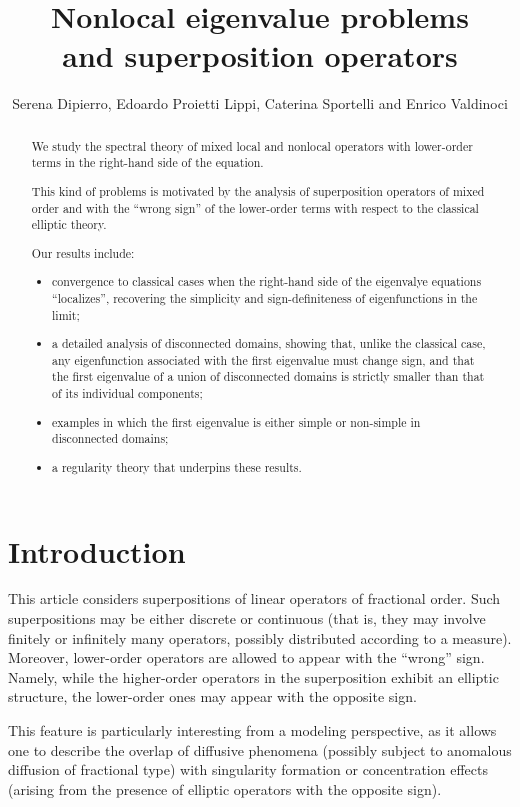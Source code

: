 \documentclass[12pt,a4paper,intlimits,sumlimits]{amsart}
\title[Nonlocal eigenvalue problems]{Nonlocal eigenvalue problems \\
and superposition operators}
\author{Serena Dipierro, Edoardo Proietti Lippi, Caterina Sportelli and Enrico Valdinoci}
\theoremstyle{definition}
\theoremstyle{plain}
\numberwithin{equation}{section}
\begin{document}
\maketitle

\begin{abstract}
We study the spectral theory of mixed local and nonlocal operators with lower-order terms in the right-hand side of the equation. 

This kind of problems is motivated by the
analysis of superposition operators of mixed order and with the ``wrong sign''
of the lower-order terms
with respect to the classical elliptic theory.

Our results include: 
\begin{itemize}
\item convergence to classical cases when the right-hand side of the eigenvalye equations ``localizes'', recovering the simplicity and sign-definiteness of eigenfunctions in the limit;
\item a detailed analysis of disconnected domains, showing that, unlike the classical case, any eigenfunction associated with the first eigenvalue must change sign, and that the first eigenvalue of a union of disconnected domains is strictly smaller than that of its individual components;
\item examples in which the first eigenvalue is either simple or non-simple in disconnected domains;
\item a regularity theory that underpins these results. \end{itemize}
\end{abstract}

\tableofcontents

\section{Introduction} 

This article considers superpositions of linear operators of fractional order. Such superpositions may be either discrete or continuous (that is, they may involve finitely or infinitely many operators, possibly distributed according to a measure). Moreover, lower-order operators are allowed to appear with the ``wrong'' sign. Namely, while the higher-order operators in the superposition exhibit an elliptic structure, the lower-order ones may appear with the opposite sign.

This feature is particularly interesting from a modeling perspective, as it allows one to describe the overlap of diffusive phenomena (possibly subject to anomalous diffusion of fractional type) with singularity formation or concentration effects (arising from the presence of elliptic operators with the opposite sign).
\end{document}
